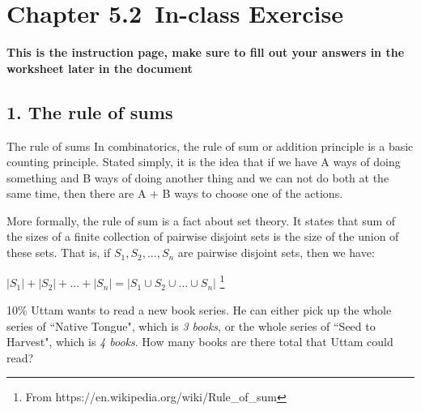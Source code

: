 \documentclass[a4paper,12pt]{book}
\title{}
\author{Rachel Morris}
\date{\today}
\newcommand{\laChapter}{5.2\ }
\begin{document}
    \toggletrue{answerkey}

    
    \chapter*{Chapter \laChapter In-class Exercise} 
    

    \begin{center}
        \textbf{This is the instruction page, 
        make sure to fill out your answers in the \textbf{worksheet} later in the document}
    \end{center}

    \section*{1. The rule of sums}

        \begin{intro}{The rule of sums}
        In combinatorics, the rule of sum or addition principle is a basic counting principle. Stated simply, it is the idea that if we have A ways of doing something and B ways of doing another thing and we can not do both at the same time, then there are A + B ways to choose one of the actions.

        More formally, the rule of sum is a fact about set theory. It states that sum of the sizes of a finite collection of pairwise disjoint sets is the size of the union of these sets. That is, if
        $S_{1}, S_{2}, ..., S_{n}$ are pairwise disjoint sets, then we have:

        $|S_{1}| + |S_{2}| + ... + |S_{n}| = |S_{1} \cup S_{2} \cup ... \cup S_{n}|$
        \footnote{From https://en.wikipedia.org/wiki/Rule\_of\_sum}
        \end{intro}

        \begin{question}{1}{10\%}
            Uttam wants to read a new book series. He can either pick up
            the whole series of ``Native Tongue", which is \textit{3 books},
            or the whole series
            of ``Seed to Harvest", which is \textit{4 books}. How many books are there total
            that Uttam could read?
        \end{question}
\end{document}
